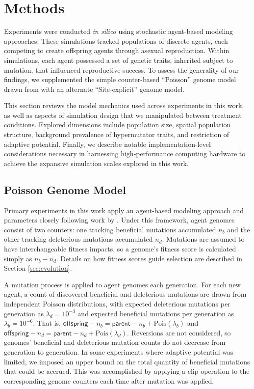 \section{Methods} \label{sec:methods}

Experiments were conducted \textit{in silico} using stochastic agent-based modeling approaches.
These simulations tracked populations of discrete agents, each competing to create offspring agents through asexual reproduction.
Within simulations, each agent possessed a set of genetic traits, inherited subject to mutation, that influenced reproductive success.
To assess the generality of our findings, we supplemented the simple counter-based ``Poisson'' genome model drawn from \cite{raynes2018sign} with an alternate ``Site-explicit'' genome model.

This section reviews the model mechanics used across experiments in this work, as well as aspects of simulation design that we manipulated between treatment conditions.
Explored dimensions include population size, spatial population structure, background prevalence of hypermutator traits, and restriction of adaptive potential.
Finally, we describe notable implementation-level considerations necessary in harnessing high-performance computing hardware to achieve the expansive simulation scales explored in this work.

\subsection{Poisson Genome Model} \label{sec:poisson}

Primary experiments in this work apply an agent-based modeling approach and parameters closely following work by \cite{raynes2018sign}.
Under this framework, agent genomes consist of two counters: one tracking beneficial mutations accumulated $n_b$ and the other tracking deleterious mutations accumulated $n_d$.
Mutations are assumed to have interchangeable fitness impacts, so a genome’s fitness score is calculated simply as $n_b - n_d$.
Details on how fitness scores guide selection are described in Section \ref{sec:evolution}.

A mutation process is applied to agent genomes each generation.
For each new agent, a count of discovered beneficial and deleterious mutations are drawn from independent Poisson distributions, with expected deleterious mutations per generation as
$\lambda_d=10^{-3}$ and expected beneficial mutations per generation as $\lambda_b=10^{-6}$.
That is, $\mathsf{offspring-}n_b = \mathsf{parent-}n_b + \mathrm{Pois}(\lambda_b)$ and $\mathsf{offspring-}n_d = \mathsf{parent-}n_d + \mathrm{Pois}(\lambda_d)$.
Reversions are not considered, so genomes' beneficial and deleterious mutation counts do not decrease from generation to generation.
In some experiments where adaptive potential was limited, we imposed an upper bound on the total quantity of beneficial mutations that could be accrued.
This was accomplished by applying a clip operation to the corresponding genome counters each time after mutation was applied.

